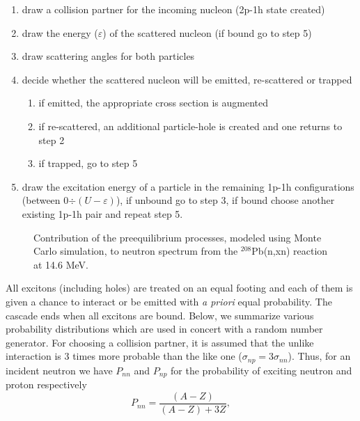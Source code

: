 \begin{enumerate}
\item draw a collision partner for the incoming nucleon (2p-1h state created)

\item draw the energy ($\varepsilon$) of the scattered nucleon (if bound go to
step 5)

\item draw scattering angles for both particles

\item decide whether the scattered nucleon will be emitted, re-scattered or
trapped

\begin{enumerate}
\item if emitted, the appropriate cross section is augmented

\item if re-scattered, an additional particle-hole is created and one returns to
step 2

\item if trapped, go to step 5
\end{enumerate}

\item draw the excitation energy of a particle in the remaining 1p-1h
configurations (between 0$\div(U-\varepsilon)$), if unbound go to step 3, if
bound choose another existing 1p-1h pair and repeat step 5.
\end{enumerate}

\begin{figure}[htbp]
\caption{Contribution of the preequilibrium processes, modeled using Monte Carlo
simulation, to neutron spectrum from the $^{208}$Pb(n,xn) reaction at 14.6
MeV.}
\label{pb208HMS}
\end{figure}

All excitons (including holes) are treated on an equal footing and each of them
is given a chance to interact or be emitted with \emph{a priori} equal
probability. The cascade ends when all excitons are bound. Below, we
summarize various probability distributions which are used in concert with a
random number generator. For choosing a collision partner, it is assumed that
the unlike interaction is 3 times more probable than the like one ($%
\sigma_{np}=3\sigma_{nn}$). Thus, for an incident neutron we have $P_{nn}$
and $P_{np}$ for the probability of exciting neutron and proton respectively
\begin{equation}
P_{nn}=%
\frac{(A-Z)}{(A-Z)+3Z},  \label{Pnn}
\end{equation}


